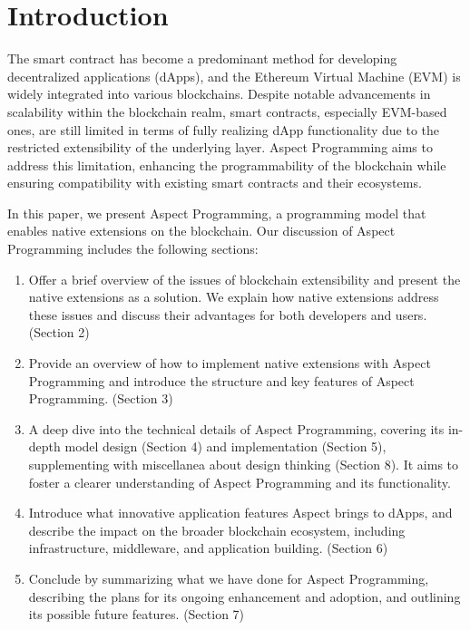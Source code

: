 
\section{Introduction}

The smart contract has become a predominant method for developing decentralized applications (dApps), and the Ethereum Virtual Machine (EVM) is widely integrated into various blockchains. Despite notable advancements in scalability within the blockchain realm, smart contracts, especially EVM-based ones, are still limited in terms of fully realizing dApp functionality due to the restricted extensibility of the underlying layer. Aspect Programming aims to address this limitation, enhancing the programmability of the blockchain while ensuring compatibility with existing smart contracts and their ecosystems.

In this paper, we present Aspect Programming, a programming model that enables native extensions on the blockchain. Our discussion of Aspect Programming includes the following sections:

\begin{enumerate}
  \item Offer a brief overview of the issues of blockchain extensibility and present the native extensions as a solution. We explain how native extensions address these issues and discuss their advantages for both developers and users. (Section 2)
  \item Provide an overview of how to implement native extensions with Aspect Programming and introduce the structure and key features of Aspect Programming. (Section 3)
  \item A deep dive into the technical details of Aspect Programming, covering its in-depth model design (Section 4) and implementation (Section 5), supplementing with miscellanea about design thinking (Section 8). It aims to foster a clearer understanding of Aspect Programming and its functionality.
  \item Introduce what innovative application features Aspect brings to dApps, and describe the impact on the broader blockchain ecosystem, including infrastructure, middleware, and application building. (Section 6)
  \item Conclude by summarizing what we have done for Aspect Programming, describing the plans for its ongoing enhancement and adoption, and outlining its possible future features. (Section 7)
\end{enumerate}
